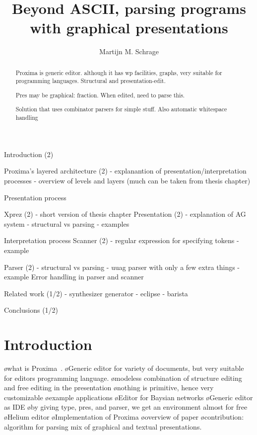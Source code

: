 \documentclass[12pt]{article}
\title{Beyond ASCII, parsing programs with graphical presentations \\{\small \version}}
\author{Martijn M. Schrage\inst{1}}
\begin{document}
 

\maketitle

\begin{abstract}
Proxima is generic editor. although it has wp facilities, graphs, very suitable for programming languages. Structural and presentation-edit.

Pres may be graphical: fraction. When edited, need to parse this.

Solution that uses combinator parsers for simple stuff. Also automatic whitespace handling
\end{abstract}
     
\bc

Introduction (2)

Proxima's layered architecture (2)
- explanantion of presentation/interpretation processes
- overview of levels and layers
  (much can be taken from thesis chapter)
  
Presentation process
  
  Xprez (2)
  - short version of thesis chapter
  Presentation (2)
  - explanation of AG system
  - structural vs parsing
  - examples
   
Interpretation process 
  Scanner (2)
  - regular expression for specifying tokens
  - example
 
  Parser  (2)
   - structural vs parsing
   - uuag parser with only a few extra things
   - example
  Error handling in parser and scanner
 
Related work (1/2)
- synthesizer generator
- eclipse
- barista

Conclusions (1/2)

\ec

\section{Introduction}

\bl
\o what is Proxima~\cite{schrage04Proxima}.
\o Generic editor for variety of documents, but very suitable for editors programming language.
\o modeless combination of structure editing and free editing in the presentation
\o nothing is primitive, hence very customizable
\o example applications
\o Editor for Baysian networks
\o Generic editor as IDE
\o by giving type, pres, and parser, we get an environment almost for free
\o Helium editor
\o Implementation of Proxima
\o overview of paper 
\el
\bl
\o contribution: algorithm for parsing mix of graphical and textual presentations.
\end{document}
